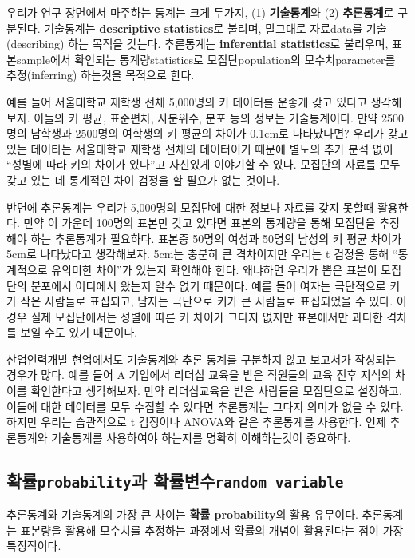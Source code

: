 \documentclass[
]{book}
\begin{document}
우리가 연구 장면에서 마주하는 통계는 크게 두가지, (1) \textbf{기술통계}와 (2) \textbf{추론통계}로 구분된다. 기술통계는 \textbf{descriptive statistics}로 불리며, 말그대로 자료data를 기술(describing) 하는 목적을 갖는다. 추론통계는 \textbf{inferential statistics}로 불리우며, 표본sample에서 확인되는 통계량statistics로 모집단population의 모수치parameter를 추정(inferring) 하는것을 목적으로 한다.

예를 들어 서울대학교 재학생 전체 5,000명의 키 데이터를 운좋게 갖고 있다고 생각해보자. 이들의 키 평균, 표준편차, 사분위수, 분포 등의 정보는 기술통계이다. 만약 2500명의 남학생과 2500명의 여학생의 키 평균의 차이가 0.1cm로 나타났다면? 우리가 갖고 있는 데이타는 서울대학교 재학생 전체의 데이터이기 때문에 별도의 추가 분석 없이 ``성별에 따라 키의 차이가 있다''고 자신있게 이야기할 수 있다. 모집단의 자료를 모두 갖고 있는 데 통계적인 차이 검정을 할 필요가 없는 것이다.

반면에 추론통계는 우리가 5,000명의 모집단에 대한 정보나 자료를 갖지 못할때 활용한다. 만약 이 가운데 100명의 표본만 갖고 있다면 표본의 통계량을 통해 모집단을 추정해야 하는 추론통계가 필요하다. 표본중 50명의 여성과 50명의 남성의 키 평균 차이가 5cm로 나타났다고 생각해보자. 5cm는 충분히 큰 격차이지만 우리는 t 검정을 통해 ``통계적으로 유의미한 차이''가 있는지 확인해야 한다. 왜냐하면 우리가 뽑은 표본이 모집단의 분포에서 어디에서 왔는지 알수 없기 떄문이다. 예를 들어 여자는 극단적으로 키가 작은 사람들로 표집되고, 남자는 극단으로 키가 큰 사람들로 표집되었을 수 있다. 이 경우 실제 모집단에서는 성별에 따른 키 차이가 그다지 없지만 표본에서만 과다한 격차를 보일 수도 있기 때문이다.

산업인력개발 현업에서도 기술통계와 추론 통계를 구분하지 않고 보고서가 작성되는 경우가 많다. 예를 들어 A 기업에서 리더십 교육을 받은 직원들의 교육 전후 지식의 차이를 확인한다고 생각해보자. 만약 리더십교육을 받은 사람들을 모집단으로 설정하고, 이들에 대한 데이터를 모두 수집할 수 있다면 추론통계는 그다지 의미가 없을 수 있다. 하지만 우리는 습관적으로 t 검정이나 ANOVA와 같은 추론통계를 사용한다. 언제 추론통계와 기술통계를 사용하여야 하는지를 명확히 이해하는것이 중요하다.

\subsection{\texorpdfstring{확률\texttt{probability}과 확률변수\texttt{random\ variable}}{확률probability과 확률변수random variable}}\label{uxd655uxb960probabilityuxacfc-uxd655uxb960uxbcc0uxc218random-variable}

추론통계와 기술통계의 가장 큰 차이는 \textbf{확률 probability}의 활용 유무이다. 추론통계는 표본량을 활용해 모수치를 추정하는 과정에서 확률의 개념이 활용된다는 점이 가장 특징적이다.
\end{document}
